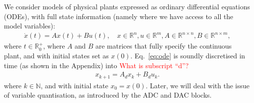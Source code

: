 \documentclass[runningheads,a4paper]{llncs}
\begin{document}
We consider models of physical plants expressed as ordinary differential equations (ODEs), 
with full state information (namely where we have access to all the model variables):  
%
\begin{align}
\label{eq:ode}
\dot{x}(t) = Ax(t)+ B u(t), \quad x \in \mathbb{R}^{n}, u \in \mathbb{R}^m, A \in \mathbb{R}^{n \times n}, B \in \mathbb{R}^{n \times m}, 
\end{align}
where $t \in \mathbb R_0^+$, 
where $A$ and $B$ are matrices that fully specify the continuous plant, 
and with initial states set as $x(0)$. 
Eq.~\eqref{eq:ode} is soundly discretised in time (as shown in the Appendix) into \textcolor{red}{What is subscript ``d''?}
%
\begin{align}
\label{eq:plant}
x_{k+1} = A_d x_k+ B_d u_k. 
\end{align} 
where $k \in \mathbb N$, 
and with initial state $x_{0}=x(0)$. 
Later, we will deal with the issue of variable quantisation, as introduced by the ADC and DAC blocks.  
\end{document}
